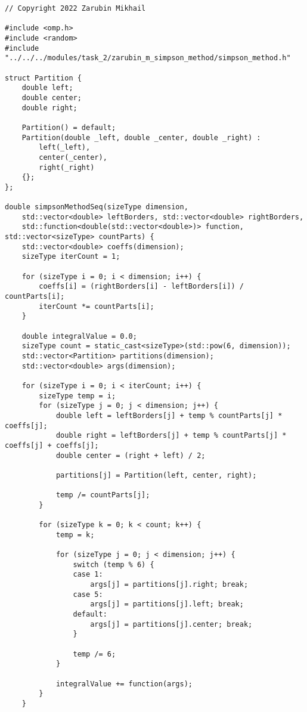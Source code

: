 \documentclass{report}
\begin{document}
\begin{lstlisting}
// Copyright 2022 Zarubin Mikhail

#include <omp.h>
#include <random>
#include "../../../modules/task_2/zarubin_m_simpson_method/simpson_method.h"

struct Partition {
    double left;
    double center;
    double right;

    Partition() = default;
    Partition(double _left, double _center, double _right) :
        left(_left),
        center(_center),
        right(_right)
    {};
};

double simpsonMethodSeq(sizeType dimension,
    std::vector<double> leftBorders, std::vector<double> rightBorders,
    std::function<double(std::vector<double>)> function, std::vector<sizeType> countParts) {
    std::vector<double> coeffs(dimension);
    sizeType iterCount = 1;

    for (sizeType i = 0; i < dimension; i++) {
        coeffs[i] = (rightBorders[i] - leftBorders[i]) / countParts[i];
        iterCount *= countParts[i];
    }

    double integralValue = 0.0;
    sizeType count = static_cast<sizeType>(std::pow(6, dimension));
    std::vector<Partition> partitions(dimension);
    std::vector<double> args(dimension);

    for (sizeType i = 0; i < iterCount; i++) {
        sizeType temp = i;
        for (sizeType j = 0; j < dimension; j++) {
            double left = leftBorders[j] + temp % countParts[j] * coeffs[j];
            double right = leftBorders[j] + temp % countParts[j] * coeffs[j] + coeffs[j];
            double center = (right + left) / 2;

            partitions[j] = Partition(left, center, right);

            temp /= countParts[j];
        }

        for (sizeType k = 0; k < count; k++) {
            temp = k;

            for (sizeType j = 0; j < dimension; j++) {
                switch (temp % 6) {
                case 1:
                    args[j] = partitions[j].right; break;
                case 5:
                    args[j] = partitions[j].left; break;
                default:
                    args[j] = partitions[j].center; break;
                }

                temp /= 6;
            }

            integralValue += function(args);
        }
    }


\end{lstlisting}
\end{document}
